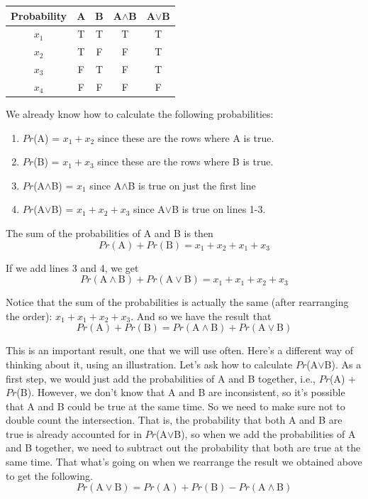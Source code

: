 \documentclass[]{tufte-book}
\providecommand{\tightlist}{%
  \setlength{\itemsep}{0pt}\setlength{\parskip}{0pt}}
\begin{document}
\begin{longtable}[]{@{}ccccc@{}}
\toprule
Probability & A & B & A\(\wedge\)B & A\(\vee\)B\tabularnewline
\midrule
\endhead
\(x_1\) & T & T & T & T\tabularnewline
\(x_2\) & T & F & F & T\tabularnewline
\(x_3\) & F & T & F & T\tabularnewline
\(x_4\) & F & F & F & F\tabularnewline
\bottomrule
\end{longtable}

We already know how to calculate the following probabilities:

\begin{enumerate}
\def\labelenumi{\arabic{enumi}.}
\tightlist
\item
  \(Pr\)(A) = \(x_1 + x_2\) since these are the rows where A is true.
\item
  \(Pr\)(B) = \(x_1 + x_3\) since these are the rows where B is true.
\item
  \(Pr\)(A\(\wedge\)B) = \(x_1\) since A\(\wedge\)B is true on just the first line
\item
  \(Pr\)(A\(\vee\)B) = \(x_1 + x_2 + x_3\) since A\(\vee\)B is true on lines 1-3.
\end{enumerate}

The sum of the probabilities of A and B is then
\[
Pr(\text{A}) + Pr(\text{B}) = x_1 + x_2 + x_1 + x_3
\]

If we add lines 3 and 4, we get
\[
Pr(\text{A}\wedge\text{B}) + Pr(\text{A}\vee\text{B}) = x_1 + x_1 + x_2 + x_3
\]

Notice that the sum of the probabilities is actually the same (after rearranging the order): \(x_1 + x_1 + x_2 + x_3\). And so we have the result that
\[
Pr(\text{A}) + Pr(\text{B}) = Pr(\text{A}\wedge\text{B}) + Pr(\text{A}\vee\text{B})
\]

This is an important result, one that we will use often. Here's a different way of thinking about it, using an illustration. Let's ask how to calculate \(Pr\)(A\(\vee\)B). As a first step, we would just add the probabilities of A and B together, i.e., \(Pr\)(A) + \(Pr\)(B). However, we don't know that A and B are inconsistent, so it's possible that A and B could be true at the same time. So we need to make sure not to double count the intersection. That is, the probability that both A and B are true is already accounted for in \(Pr\)(A\(\vee\)B), so when we add the probabilities of A and B together, we need to subtract out the probability that both are true at the same time. That what's going on when we rearrange the result we obtained above to get the following.
\[
 Pr(\text{A}\vee\text{B}) = Pr(\text{A}) + Pr(\text{B}) - Pr(\text{A}\wedge\text{B}) 
\]
\end{document}
